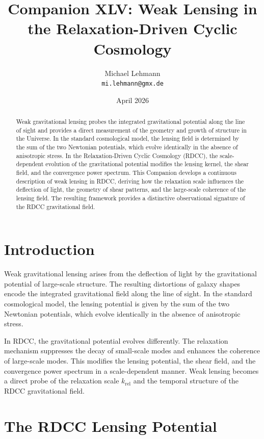 \documentclass[11pt,a4paper]{article}
\title{\textbf{Companion XLV: Weak Lensing in the Relaxation-Driven Cyclic Cosmology}}
\author{Michael Lehmann \\ \texttt{mi.lehmann@gmx.de}}
\date{April 2026}
\begin{document}
\maketitle

\begin{abstract}
Weak gravitational lensing probes the integrated gravitational potential along the 
line of sight and provides a direct measurement of the geometry and growth of 
structure in the Universe. In the standard cosmological model, the lensing field is 
determined by the sum of the two Newtonian potentials, which evolve identically in 
the absence of anisotropic stress. In the Relaxation-Driven Cyclic Cosmology (RDCC), 
the scale-dependent evolution of the gravitational potential modifies the lensing 
kernel, the shear field, and the convergence power spectrum. This Companion develops 
a continuous description of weak lensing in RDCC, deriving how the relaxation scale 
influences the deflection of light, the geometry of shear patterns, and the 
large-scale coherence of the lensing field. The resulting framework provides a 
distinctive observational signature of the RDCC gravitational field.
\end{abstract}
\section{Introduction}

Weak gravitational lensing arises from the deflection of light by the gravitational 
potential of large-scale structure. The resulting distortions of galaxy shapes 
encode the integrated gravitational field along the line of sight. In the standard 
cosmological model, the lensing potential is given by the sum of the two Newtonian 
potentials, which evolve identically in the absence of anisotropic stress.

In RDCC, the gravitational potential evolves differently. The relaxation mechanism 
suppresses the decay of small-scale modes and enhances the coherence of large-scale 
modes. This modifies the lensing potential, the shear field, and the convergence 
power spectrum in a scale-dependent manner. Weak lensing becomes a direct probe of 
the relaxation scale $k_{\mathrm{rel}}$ and the temporal structure of the RDCC 
gravitational field.
\section{The RDCC Lensing Potential}
\end{document}
